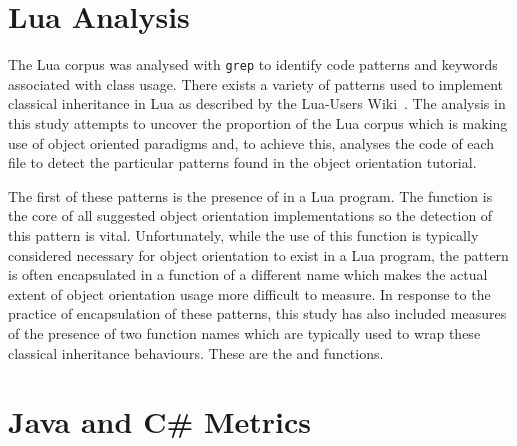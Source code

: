 \section{Lua Analysis}
The Lua corpus was analysed with \texttt{grep} to identify code patterns and keywords associated with class usage. There exists a variety of patterns used to implement classical inheritance in Lua as described by the Lua-Users Wiki~\cite{LuaObjectOrientation}. The analysis in this study attempts to uncover the proportion of the Lua corpus which is making use of object oriented paradigms and, to achieve this, analyses the code of each file to detect the particular patterns found in the object orientation tutorial.
\newline

The first of these patterns is the presence of  in a Lua program. The  function is the core of all suggested object orientation implementations so the detection of this pattern is vital. Unfortunately, while the use of this function is typically considered necessary for object orientation to exist in a Lua program, the pattern is often encapsulated in a function of a different name which makes the actual extent of object orientation usage more difficult to measure. In response to the practice of encapsulation of these patterns, this study has also included measures of the presence of two function names which are typically used to wrap these classical inheritance behaviours. These are the  and  functions.

\section{Java and C\# Metrics}

